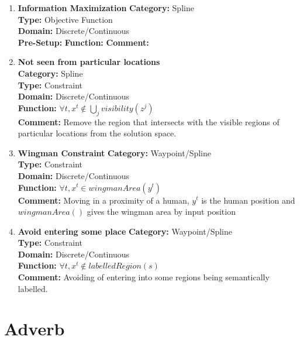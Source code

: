 \documentclass[12pt]{article}
\begin{document}
\begin{enumerate}
\item \textbf{Information Maximization}
\label{obj:info_max}
\textbf{Category:} Spline \\
\textbf{Type:} Objective Function \\
\textbf{Domain:} Discrete/Continuous \\
\textbf{Pre-Setup:} 
\textbf{Function:}
\textbf{Comment:}   \\

\item \textbf{Not seen from particular locations} \\
\label{obj:not_seen}
\textbf{Category:} Spline \\
\textbf{Type:} Constraint \\
\textbf{Domain:} Discrete/Continuous \\
\textbf{Function:} $ \forall t, x^{t} \notin \bigcup_{j} visibility(z^{j}) $ \\
\textbf{Comment:} Remove the region that intersects with the visible regions of particular locations from the solution space. \\

\item \textbf{Wingman Constraint}
\label{obj:wingman}
\textbf{Category:} Waypoint/Spline \\
\textbf{Type:} Constraint \\
\textbf{Domain:} Discrete/Continuous \\
\textbf{Function:} $ \forall t, x^{t} \in wingmanArea(y^{t}) $ \\
\textbf{Comment:} Moving in a proximity of a human, $ y^{t} $ is the human position and $ wingmanArea() $ gives the wingman area by input position \\

\item \textbf{Avoid entering some place}
\label{obj:avd_enter}
\textbf{Category:} Waypoint/Spline \\
\textbf{Type:} Constraint \\
\textbf{Domain:} Discrete/Continuous \\
\textbf{Function:} $ \forall t, x^{t} \notin labelledRegion(s) $ \\
\textbf{Comment:} Avoiding of entering into some regions being semantically labelled. \\


\end{enumerate}

\section{Adverb}
\end{document}

